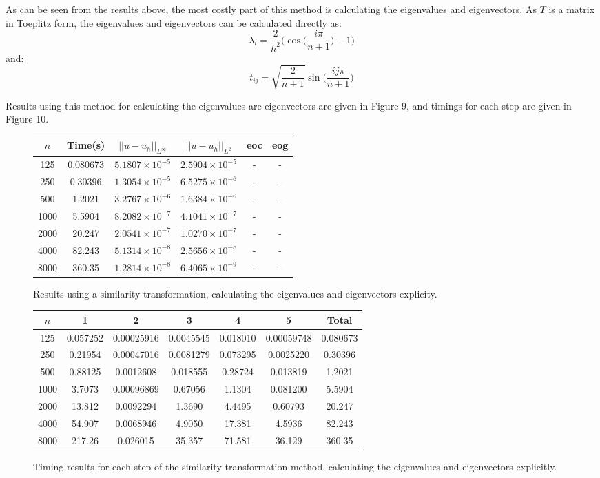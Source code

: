 \documentclass{article}
\numberwithin{equation}{section}
\begin{document}
As can be seen from the results above, the most costly part of this method is calculating the eigenvalues and eigenvectors. As $T$ is a matrix in Toeplitz form, the eigenvalues and eigenvectors can be calculated directly as:
\[ \lambda_i = \frac{2}{h^2} \Big( \cos \Big( \frac{i \pi}{n+1} \Big) - 1 \Big) \]
and:
\[ t_{ij} = \sqrt{\frac{2}{n+1}} \sin \Big( \frac{ij \pi}{n+1}  \Big) \]

Results using this method for calculating the eigenvalues are eigenvectors are given in Figure 9, and timings for each step are given in Figure 10.

\begin{figure}[H]
\centering
\begin{tabular}{|c|c|c|c|c|c|}
\hline
$n$ & Time(s) & $|| u - u_h ||_{L^{\infty}}$ &$|| u - u_h ||_{L^{2}}$ & eoc & eog\\
\hline
125 & 0.080673 & $5.1807 \times 10^{-5}$ & $2.5904 \times 10^{-5}$ & - & -  \\
250 & 0.30396 & $1.3054 \times 10^{-5}$ & $6.5275 \times 10^{-6}$ & - & -  \\
500 & 1.2021 & $3.2767 \times 10^{-6}$ & $1.6384 \times 10^{-6}$ & - & -  \\
1000 & 5.5904 & $8.2082 \times 10^{-7}$ & $4.1041 \times 10^{-7}$ & - & -  \\
2000 & 20.247 & $2.0541 \times 10^{-7}$ & $1.0270 \times 10^{-7}$ & - & -  \\
4000 & 82.243 & $5.1314 \times 10^{-8}$ & $2.5656 \times 10^{-8}$ & - & -  \\
8000 & 360.35 & $1.2814 \times 10^{-8}$ & $6.4065 \times 10^{-9}$ & - & -  \\
\hline
\end{tabular}
\captionsetup{justification=centering}
\caption{Results using a similarity transformation, calculating the eigenvalues and eigenvectors explicity.}
\end{figure}

\begin{figure}[H]
\centering
\begin{tabular}{|c|c|c|c|c|c|c|}
\hline
$n$ & 1 & 2 & 3 & 4 & 5 & Total \\
\hline
125 & 0.057252 & 0.00025916 & 0.0045545 & 0.018010 & 0.00059748 & 0.080673 \\
250 & 0.21954 & 0.00047016 & 0.0081279 & 0.073295 & 0.0025220 & 0.30396 \\ 
500 & 0.88125 & 0.0012608 & 0.018555 & 0.28724 & 0.013819 & 1.2021  \\
1000 & 3.7073 & 0.00096869 & 0.67056 & 1.1304 & 0.081200 & 5.5904 \\
2000 & 13.812 & 0.0092294 & 1.3690 & 4.4495 & 0.60793 & 20.247 \\
4000 & 54.907 & 0.0068946 & 4.9050 & 17.381 & 4.5936 & 82.243 \\
8000 & 217.26 & 0.026015 & 35.357 & 71.581 & 36.129 & 360.35 \\
\hline
\end{tabular}
\captionsetup{justification=centering}
\caption{Timing results for each step of the similarity transformation method, calculating the eigenvalues and eigenvectors explicitly.}
\end{figure}
\end{document}
